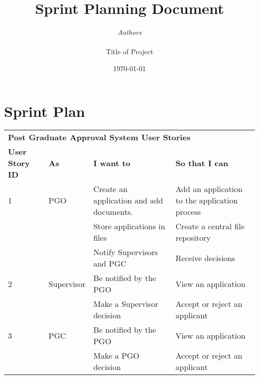 \documentclass[11pt]{article}
\begin{document}

\thispagestyle{empty}
\title{{\LARGE\bf Sprint Planning Document}}
\author{{\Large\it Authors} \\
\vspace*{2.5in} 
\mbox{} \\
{\Large Title of Project}
\vspace*{2.5in} 
\mbox{} \\
\date{\today}
}
\maketitle


%

\section{Sprint Plan}

	\begin{table}[H]
		\begin{tabular}{llll}
			\multicolumn{4}{l}{{\textbf{Post Graduate Approval System User Stories}}}                                                   \\
			\textbf{User Story ID} & \textbf{As} & \textbf{I want to}                       & \textbf{So that I can}                        \\
			1                      & PGO         & Create an application and add documents. & Add an application to the application process \\
			&             & Store applications in files              & Create a central file repository              \\
			&             & Notify Supervisors and PGC               & Receive decisions                             \\
			2                      & Supervisor  & Be notified by the PGO                   & View an application                           \\
			&             & Make a Supervisor decision               & Accept or reject an applicant                 \\
			3                      & PGC         & Be notified by the PGO                   & View an application                           \\
			&             & Make a PGO decision                      & Accept or reject an applicant                
		\end{tabular}
	\end{table}
\end{document}
